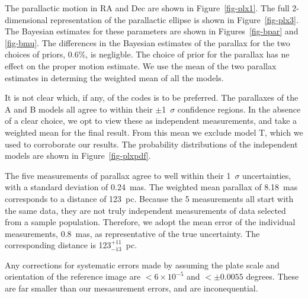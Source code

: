 \documentclass[12pt,preprint]{aastex}
\newcommand{\ud}[2]{\mbox{$^{+ #1}_{- #2}$}}
\begin{document}
The parallactic motion in RA and Dec are shown in 
Figure~\ref{fig-plx1}. The full 2-dimensional representation of the
parallactic ellipse is shown in Figure~\ref{fig-plx3}.
The Bayesian estimates for these parameters are shown in Figures~\ref{fig-bpar}
and \ref{fig-bmu}. The differences in the Bayesian estimates of the parallax
for the two choices of priors, 0.6\%, is negligble.  The choice of prior
for the parallax has ne effect on the proper motion estimate.
We use the mean of the two parallax estimates
in determing the weighted mean of all the models.

It is not clear which, if any, of the codes is to be preferred. 
The parallaxes of the A and B models all agree to within their $\pm$1~$\sigma$
confidence regions.
In the absence of a clear choice, we opt to view these as independent
measurements, and 
take a weighted mean for the final result. From this mean we exclude 
model T, which we used to corroborate our results.
The probability distributions of the independent models are shown in
Figure~\ref{fig-plxpdf}.

The five measurements of parallax agree to well within their 1~$\sigma$
uncertainties, with a standard deviation of 0.24~mas.
The weighted mean parallax of 8.18~mas corresponds to a distance of 123~pc.
Because the 5 measurements all start with the same data, they are not truly
independent measurements of data selected from a sample population. Therefore,
we adopt the mean error of the individual measurements, 0.8~mas, as
representative of the true uncertainty. The corresponding distance is
123\ud{11}{13}~pc.

Any corrections for systematic errors made by assuming the plate scale and 
orientation of the reference image are $<6\times 10^{-5}$ and $<\pm0.0055$
degrees. These are far smaller than our mesasurement errors, and are
inconequential.

\end{document}
